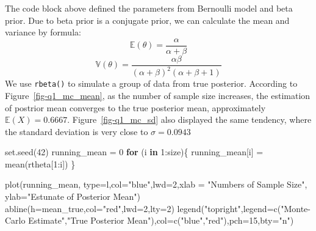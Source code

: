 \documentclass[
  letterpaper,
  DIV=11,
  numbers=noendperiod]{scrartcl}
\newenvironment{Shaded}{\begin{snugshade}}{\end{snugshade}}
\newcommand{\AttributeTok}[1]{\textcolor[rgb]{0.40,0.45,0.13}{#1}}
\newcommand{\ControlFlowTok}[1]{\textcolor[rgb]{0.00,0.23,0.31}{\textbf{#1}}}
\newcommand{\DecValTok}[1]{\textcolor[rgb]{0.68,0.00,0.00}{#1}}
\newcommand{\FunctionTok}[1]{\textcolor[rgb]{0.28,0.35,0.67}{#1}}
\newcommand{\NormalTok}[1]{\textcolor[rgb]{0.00,0.23,0.31}{#1}}
\newcommand{\OtherTok}[1]{\textcolor[rgb]{0.00,0.23,0.31}{#1}}
\newcommand{\SpecialCharTok}[1]{\textcolor[rgb]{0.37,0.37,0.37}{#1}}
\newcommand{\StringTok}[1]{\textcolor[rgb]{0.13,0.47,0.30}{#1}}
\begin{document}
The code block above defined the parameters from Bernoulli model and
beta prior. Due to beta prior is a conjugate prior, we can calculate the
mean and variance by formula:
\[\mathbb{E}(\theta)=\frac{\alpha}{\alpha+\beta}\]
\[\mathbb{V}(\theta)=\frac{\alpha \beta}{(\alpha+\beta)^2(\alpha+\beta+1)}\]
We use \texttt{rbeta()} to simulate a group of data from true posterior.
According to Figure~\ref{fig-q1_mc_mean}, as the number of sample size
increases, the estimation of postrior mean converges to the true
posterior mean, approximately \(\mathbb{E}(X)=0.6667\).
Figure~\ref{fig-q1_mc_sd} also displayed the same tendency, where the
standard deviation is very close to \(\sigma = 0.0943\)

\begin{Shaded}
\begin{Highlighting}[]
\FunctionTok{set.seed}\NormalTok{(}\DecValTok{42}\NormalTok{)}
\NormalTok{running\_mean }\OtherTok{=} \DecValTok{0}
\ControlFlowTok{for}\NormalTok{ (i }\ControlFlowTok{in} \DecValTok{1}\SpecialCharTok{:}\NormalTok{size)\{}
\NormalTok{  running\_mean[i] }\OtherTok{=} \FunctionTok{mean}\NormalTok{(rtheta[}\DecValTok{1}\SpecialCharTok{:}\NormalTok{i])}
\NormalTok{\}}

\FunctionTok{plot}\NormalTok{(running\_mean, }\AttributeTok{type=}\StringTok{\textquotesingle{}l\textquotesingle{}}\NormalTok{,}\AttributeTok{col=}\StringTok{"blue"}\NormalTok{,}\AttributeTok{lwd=}\DecValTok{2}\NormalTok{,}\AttributeTok{xlab =} \StringTok{"Numbers of Sample Size"}\NormalTok{, }\AttributeTok{ylab=}\StringTok{"Estunate of Posterior Mean"}\NormalTok{)}
\FunctionTok{abline}\NormalTok{(}\AttributeTok{h=}\NormalTok{mean\_true,}\AttributeTok{col=}\StringTok{"red"}\NormalTok{,}\AttributeTok{lwd=}\DecValTok{2}\NormalTok{,}\AttributeTok{lty=}\DecValTok{2}\NormalTok{)}
\FunctionTok{legend}\NormalTok{(}\StringTok{"topright"}\NormalTok{,}\AttributeTok{legend=}\FunctionTok{c}\NormalTok{(}\StringTok{"Monte{-}Carlo Estimate"}\NormalTok{,}\StringTok{"True Posterior Mean"}\NormalTok{),}\AttributeTok{col=}\FunctionTok{c}\NormalTok{(}\StringTok{"blue"}\NormalTok{,}\StringTok{"red"}\NormalTok{),}\AttributeTok{pch=}\DecValTok{15}\NormalTok{,}\AttributeTok{bty=}\StringTok{"n"}\NormalTok{)}
\end{Highlighting}
\end{Shaded}
\end{document}
